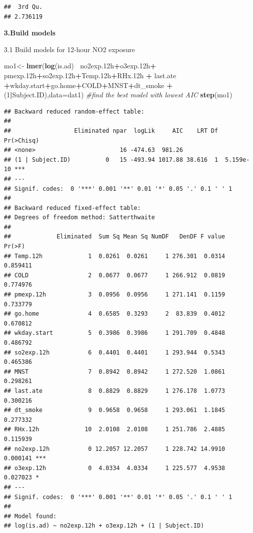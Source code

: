 \documentclass[12pt,]{article}
\newenvironment{Shaded}{\begin{snugshade}}{\end{snugshade}}
\newcommand{\CommentTok}[1]{\textcolor[rgb]{0.56,0.35,0.01}{\textit{#1}}}
\newcommand{\DataTypeTok}[1]{\textcolor[rgb]{0.13,0.29,0.53}{#1}}
\newcommand{\DecValTok}[1]{\textcolor[rgb]{0.00,0.00,0.81}{#1}}
\newcommand{\FloatTok}[1]{\textcolor[rgb]{0.00,0.00,0.81}{#1}}
\newcommand{\KeywordTok}[1]{\textcolor[rgb]{0.13,0.29,0.53}{\textbf{#1}}}
\newcommand{\NormalTok}[1]{#1}
\newcommand{\OperatorTok}[1]{\textcolor[rgb]{0.81,0.36,0.00}{\textbf{#1}}}
\newcommand{\StringTok}[1]{\textcolor[rgb]{0.31,0.60,0.02}{#1}}
\begin{document}
\begin{verbatim}
##  3rd Qu. 
## 2.736119
\end{verbatim}

\textbf{3.Build models}

3.1 Build models for 12-hour NO2 exposure

\begin{Shaded}
\begin{Highlighting}[]
\NormalTok{mo1<-}\StringTok{ }\KeywordTok{lmer}\NormalTok{(}\KeywordTok{log}\NormalTok{(is.ad) }\OperatorTok{~}\NormalTok{no2exp}\FloatTok{.12}\NormalTok{h}\OperatorTok{+}\NormalTok{o3exp}\FloatTok{.12}\NormalTok{h}\OperatorTok{+}\StringTok{ }\NormalTok{pmexp}\FloatTok{.12}\NormalTok{h}\OperatorTok{+}\NormalTok{so2exp}\FloatTok{.12}\NormalTok{h}\OperatorTok{+}\NormalTok{Temp}\FloatTok{.12}\NormalTok{h}\OperatorTok{+}\NormalTok{RHx}\FloatTok{.12}\NormalTok{h }\OperatorTok{+}\StringTok{ }\NormalTok{last.ate }\OperatorTok{+}\NormalTok{wkday.start}\OperatorTok{+}\NormalTok{go.home}\OperatorTok{+}\NormalTok{COLD}\OperatorTok{+}\NormalTok{MNST}\OperatorTok{+}\NormalTok{dt_smoke }\OperatorTok{+}\NormalTok{(}\DecValTok{1}\OperatorTok{|}\NormalTok{Subject.ID),}\DataTypeTok{data=}\NormalTok{dat1)}
\CommentTok{#find the best model with lowest AIC}
\KeywordTok{step}\NormalTok{(mo1)}
\end{Highlighting}
\end{Shaded}

\begin{verbatim}
## Backward reduced random-effect table:
## 
##                  Eliminated npar  logLik     AIC    LRT Df Pr(>Chisq)    
## <none>                        16 -474.63  981.26                         
## (1 | Subject.ID)          0   15 -493.94 1017.88 38.616  1  5.159e-10 ***
## ---
## Signif. codes:  0 '***' 0.001 '**' 0.01 '*' 0.05 '.' 0.1 ' ' 1
## 
## Backward reduced fixed-effect table:
## Degrees of freedom method: Satterthwaite 
## 
##             Eliminated  Sum Sq Mean Sq NumDF   DenDF F value   Pr(>F)    
## Temp.12h             1  0.0261  0.0261     1 276.301  0.0314 0.859411    
## COLD                 2  0.0677  0.0677     1 266.912  0.0819 0.774976    
## pmexp.12h            3  0.0956  0.0956     1 271.141  0.1159 0.733779    
## go.home              4  0.6585  0.3293     2  83.839  0.4012 0.670812    
## wkday.start          5  0.3986  0.3986     1 291.709  0.4848 0.486792    
## so2exp.12h           6  0.4401  0.4401     1 293.944  0.5343 0.465386    
## MNST                 7  0.8942  0.8942     1 272.520  1.0861 0.298261    
## last.ate             8  0.8829  0.8829     1 276.178  1.0773 0.300216    
## dt_smoke             9  0.9658  0.9658     1 293.061  1.1845 0.277332    
## RHx.12h             10  2.0108  2.0108     1 251.786  2.4885 0.115939    
## no2exp.12h           0 12.2057 12.2057     1 228.742 14.9910 0.000141 ***
## o3exp.12h            0  4.0334  4.0334     1 225.577  4.9538 0.027023 *  
## ---
## Signif. codes:  0 '***' 0.001 '**' 0.01 '*' 0.05 '.' 0.1 ' ' 1
## 
## Model found:
## log(is.ad) ~ no2exp.12h + o3exp.12h + (1 | Subject.ID)
\end{verbatim}
\end{document}

